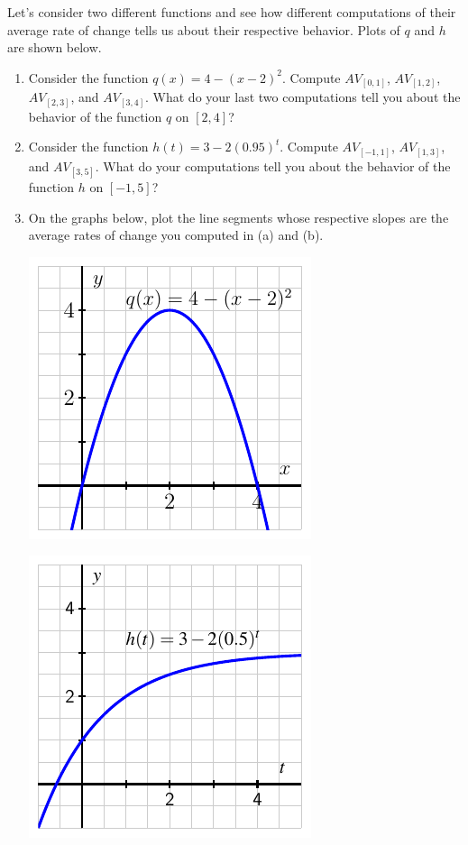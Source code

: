 \documentclass[nooutcomes]{ximera}
\begin{document}
\begin{exploration}
Let's consider two different functions and see how different computations of their average rate of change tells us about their respective behavior. Plots of $q$  and $h$ are shown below.

\begin{enumerate}[label=\alph*.]
\item Consider the function \(q(x) = 4-(x-2)^2\). Compute \(AV_{[0,1]}\), \(AV_{[1,2]}\), \(AV_{[2,3]}\), and \(AV_{[3,4]}\). What do your last two computations tell you about the behavior of the function \(q\) on \([2,4]\)?


\item Consider the function \(h(t) = 3 - 2(0.95)^t\). Compute \(AV_{[-1,1]}\), \(AV_{[1,3]}\), and \(AV_{[3,5]}\). What do your computations tell you about the behavior of the function \(h\) on \([-1,5]\)?

\item On the graphs below, plot the line segments whose respective slopes are the average rates of change you computed in (a) and (b).

\begin{image}
\includegraphics{aroc-act-trends-q}
\end{image}

\begin{image}
\includegraphics{aroc-act-trends-h}
\end{image}


\end{enumerate}
\end{exploration}
\end{document}
